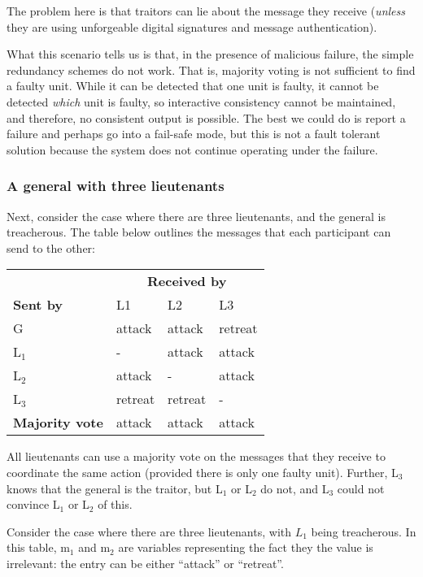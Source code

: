 The problem here is that traitors can lie about the message they receive (\emph{unless} they are using unforgeable digital signatures and message authentication).

What this scenario tells us is that, in the presence of malicious failure, the simple redundancy schemes do not work. That is, majority voting is not sufficient to find a faulty unit. While it can be detected that one unit is faulty, it cannot be detected \emph{which} unit is faulty, so interactive consistency cannot be maintained, and therefore, no consistent output is possible. The best we could do is report a failure and perhaps go into a fail-safe mode, but this is not a fault tolerant solution because the system does not continue operating under the failure.

\subsubsection*{A general with three lieutenants}

Next, consider the case where there are three lieutenants, and the general is treacherous. The table below outlines the messages that each participant can send to the other:

\begin{center}
\begin{tabular}{llll}
 \hline
  & \multicolumn{3}{c}{{\bf Received by}}\\
 \cline{2-4}
  {\bf Sent by}  & L1 & L2 & L3\\
\hline
 G & attack & attack & retreat \\
 L\(_1\) & - & attack & attack \\
 L\(_2\) & attack & - & attack \\
 L\(_3\) & retreat & retreat & - \\
 \hline
{\bf Majority vote} & attack & attack & attack\\
 \hline
\end{tabular}
\end{center}

All lieutenants can use a majority vote on the messages that they receive to coordinate the same action (provided there is only one faulty unit). Further, L\(_3\) knows that the general is the traitor, but  L\(_1\) or L\(_2\) do not, and L\(_3\) could not convince L\(_1\) or L\(_2\) of this.

Consider the case where there are three lieutenants, with \(L_1\) being treacherous. In this table, m$_1$ and m$_2$ are variables representing the fact they the value is irrelevant: the entry can be either ``attack'' or ``retreat''.

